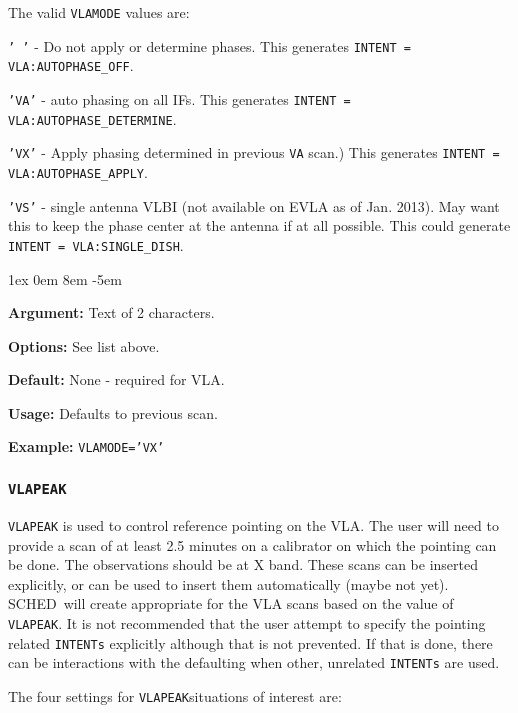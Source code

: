 \documentclass{report}
\newcommand{\schedb}{{\sc SCHED~}}
\newcommand{\rcwbox}[5]{
  \begin{list}{}{\parsep 1ex  \itemsep 0em
                 \leftmargin 8em  \itemindent -5em }
    \item {\bf Argument:} #1
    \item {\bf Options:}  #2
    \item {\bf Default:}  #3
    \item {\bf Usage:}    #4
    \item {\bf Example:}  #5
  \end{list}
}
\begin{document}
The valid {\tt VLAMODE} values are:

\begin{description}

\item  {\tt '  '} - Do not apply or determine phases.
This generates {\tt INTENT = VLA:AUTOPHASE\_OFF}.

\item  {\tt 'VA'} - auto phasing on all IFs.
This generates {\tt INTENT = VLA:AUTOPHASE\_DETERMINE}.

\item  {\tt 'VX'} - Apply phasing determined in previous {\tt VA} scan.)
This generates {\tt INTENT = VLA:AUTOPHASE\_APPLY}.

\item  {\tt 'VS'} - single antenna VLBI (not available on EVLA as of Jan. 2013).
May want this to keep the phase center at the antenna if at all possible.
This could generate {\tt INTENT = VLA:SINGLE\_DISH}.


\end{description}

\rcwbox
{Text of 2 characters.}
{See list above.}
{None - required for VLA.}
{Defaults to previous scan.}
{{\tt VLAMODE='VX'}}

\subsubsection{\label{MP:VLAPEAK}{\tt VLAPEAK}}

{\tt VLAPEAK} is used to control reference pointing on the VLA.  The
user will need to provide a scan of at least 2.5 minutes on a
calibrator on which the pointing can be done.  The observations should
be at X band.  These scans can be inserted explicitly, or
 can be used to insert them
automatically (maybe not yet).  \schedb will create appropriate
 for the VLA scans based on the
value of {\tt VLAPEAK}.  It is not recommended that the user attempt
to specify the pointing related {\tt INTENTs} explicitly although that
is not prevented.  If that is done, there can be interactions with the
defaulting when other, unrelated {\tt INTENTs} are used.

The four settings for {\tt VLAPEAK}situations of interest are:
\end{document}
